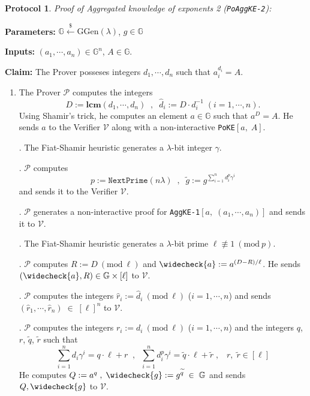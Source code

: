 \documentclass[11pt, lettersize, notitlepage, leqno, footskip=0.6cm]{article}
\newcommand{\slim}{\sum\limits}
\newcommand{\ttt}{\texttt}
\newcommand{\bG}{\mathbb{G}}
\newcommand{\wti}{\widetilde}
\newcommand{\mc}{\mathcal}
\newcommand{\mb}{\mathbb}
\newcommand{\mbf}{\mathbf}
\newcommand{\mr}{\mathrm}
\newcommand{\lam}{\lambda}
\newcommand{\lamb}{\lambda}
\newcommand{\what}{\widehat}
\newcommand{\weck}{\widecheck}
\newcommand{\vs}{\vspace{-0.15cm}}
\newcommand{\noin}{\noindent}
\newcommand{\Mod}[1]{\ (\mathrm{mod}\ #1)}
\newcommand{\LCM}{\mbf{lcm}}
\newtheorem{Prot}[Thm]{Protocol}
\numberwithin{equation}{section}
\begin{document}
\vspace{0.2cm}  

\begin{Prot}\normalfont \textit{Proof of Aggregated knowledge of exponents} 2 (\verb|PoAggKE-2|): \end{Prot}\vspace{-0.25cm}

\noindent \textbf{Parameters:} $\mb{G}\xleftarrow{\$} \mr{GGen}(\lamb)$,\; $g\in \mb{G}$ 

\noindent \textbf{Inputs:} $(a_1,\cdots,a_n) \in \mb{G}^n$, $A\in\mb{G}$.

\noindent \textbf{Claim:} The Prover posseses integers $d_1,\cdots,d_n$ such that $a_i^{d_i} = A$. \vs

\begin{enumerate}[wide, labelwidth=!, labelindent=0pt]\vs \item The Prover $\mc{P}$ computes the integers \vs $$D:= \LCM(d_1,\cdots,d_n)\;\;,\;\;\what{d}_i:= D\cdot d_i^{-1}\;(i=1,\cdots,n).$$ Using Shamir's trick, he computes an element $a\in\mb{G}$ such that $a^D = A$. He sends $a$ to the Verifier $\mc{V}$ along with a non-interactive \verb|PoKE|$[a,\;A]$.

\noin 2. The Fiat-Shamir heuristic generates a $\lam$-bit integer $\gamma$.

\noin 3. $\mc{P}$ computes $$p:= \ttt{NextPrime}(n\lam)\;\;,\;\;\wti{g} := g^{\slim_{i=1}^n d_i^{p}\gamma^i}$$ and sends it to the Verifier $\mc{V}$. 

\noin 4. $\mc{P}$ generates a non-interactive proof for \verb|AggKE-1|$[a,\;(a_1,\cdots,a_n)]$ and sends it to $\mc{V}$.

\noin 5. The Fiat-Shamir heuristic generates a $\lam$-bit prime $\ell\not\equiv 1\Mod{p}$.

\noin 6. $\mc{P}$ computes $R:= D\Mod{\ell}$ and $\weck{a}:= a^{(D-R)/\ell}$. He sends $(\weck{a}, R)\in \bG\times [\ell]$ to $\mc{V}$.

\noin 7. $\mc{P}$ computes the integers $\what{r}_i:= \what{d}_i\Mod{\ell}$ ($i=1,\cdots,n$) and sends $(\what{r}_1,\cdots,\what{r}_n)\;\in\;[\ell]^n$ to $\mc{V}$.

\noin 8. $\mc{P}$ computes the integers ${r}_i:= {d}_i\Mod{\ell}$ ($i=1,\cdots,n$) and the integers $q$, $r$, $\wti{q}$, $\wti{r}$ such that \vs $$\slim_{i=1}^n d_i\gamma^i = q \cdot \ell+r\;\;,\;\;\slim_{i=1}^n {d}_i^{p}\gamma^i = \wti{q} \cdot \ell+\wti{r}\;,\;\;\;r,\;\wti{r}\in[\ell] $$ He computes ${Q}:= a^q\;,\;\weck{g}:= g^{\wti{q}}\;\in\;\bG$ and sends ${Q}, \weck{g}$ to $\mc{V}$.


\end{enumerate}
\end{document}
